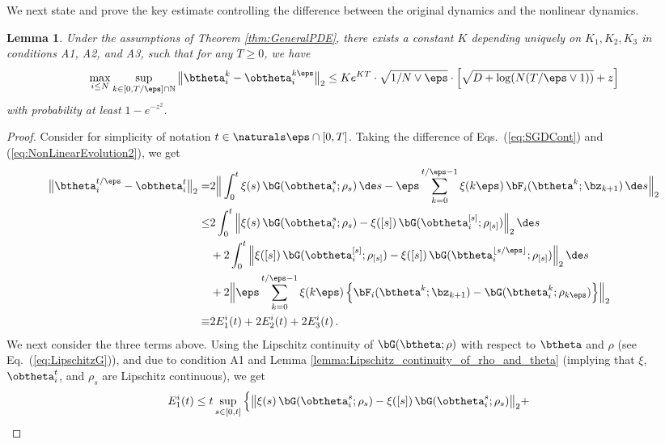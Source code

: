 \documentclass[11pt]{article}
\newtheorem{lemma}{Lemma}
\begin{document}
We next state and prove the key estimate controlling the difference between the original dynamics and the nonlinear dynamics.
% 
\begin{lemma}\label{lemma:NonlinearDynamics}
Under the assumptions of Theorem \ref{thm:GeneralPDE}, there exists a constant $K$ depending uniquely on $K_1, K_2, K_3$ in conditions {\sf A1}, {\sf A2}, and {\sf A3}, such that for any $T\ge 0$, we have
%
\begin{align}
%
\max_{i \le N}\sup_{k \in  [0, T/\eps] \cap \mathbb N}\big\|\btheta^{k}_i-\obtheta^{k \eps}_i\big\|_2
\le K e^{KT} \cdot \sqrt{1/N \vee \eps } \cdot \Big[\sqrt{D + \log(N (T/ \eps \vee 1))} + z \Big]
%
\end{align}
%
with probability at least $1- e^{-z^2}$.
\end{lemma}
%
\begin{proof}
Consider for simplicity of notation $t\in \naturals\eps\cap [0,T]$.
Taking the difference of Eqs.~(\ref{eq:SGDCont}) and (\ref{eq:NonLinearEvolution2}), we get
%
\begin{equation}
\begin{aligned}
\big\|\btheta^{t/\eps}_i-\obtheta^t_i \big\|_2 =& 2\Big\|\int_{0}^t\xi(s)\, \bG(\obtheta_i^s;\rho_s)\, \de s-\eps\sum_{k=0}^{t/\eps-1}\xi(k\eps)\, \bF_i(\btheta^{k};\bz_{k+1})\, \de s\Big\|_2\\
 \le &2\int_{0}^t\Big\|\xi(s)\, \bG(\obtheta_i^s;\rho_s)-\xi([s])\, \bG(\obtheta_i^{[s]};\rho_{[s]})\Big\|_2\, \de s \\
 &+ 2\int_{0}^t\Big\|\xi([s])\, \bG(\obtheta_i^{[s]};\rho_{[s]}) -\xi([s])\, \bG(\btheta_i^{\lfloor s/\eps\rfloor};\rho_{[s]})\Big\|_2\, \de s\\
&+ 2\Big\|\eps \sum_{k=0}^{t/\eps-1}\xi(k\eps)\, \Big\{\bF_i(\btheta^{k};\bz_{k+1}) -\bG(\btheta_i^{k};\rho_{k\eps})\Big\}\Big\|_2\\
\equiv& 2 E_1^i(t)+2 E_2^i(t)+2E_3^i(t)\, . \label{eq:ErrorsDynamics}
\end{aligned}
\end{equation}
%
We next consider the three terms above. Using the Lipschitz continuity of $\bG(\btheta;\rho)$ with respect to 
$\btheta$ and $\rho$ (see Eq.~(\ref{eq:LipschitzG})), and due to condition {\sf A1} and Lemma \ref{lemma:Lipschitz_continuity_of_rho_and_theta} (implying that $\xi$, $\obtheta^t_i$, and $\rho_s$ are Lipschitz continuous), we get 
%
\begin{align}
%
E_1^i(t)&\le t\sup_{s\in [0,t]}\Big\{\big\|\xi(s)\, \bG(\obtheta_i^s;\rho_s)-\xi([s])\, \bG(\obtheta_i^{s};\rho_s)\big\|_2 +

\end{align}
\end{proof}
\end{document}
